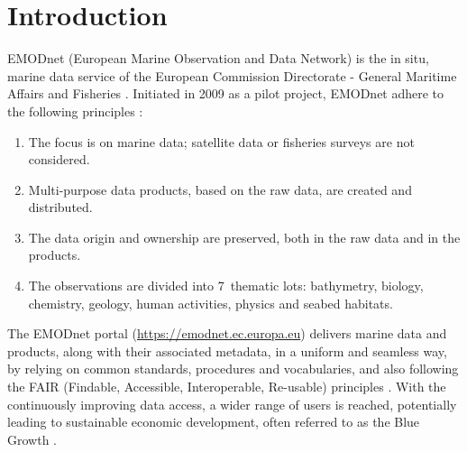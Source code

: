 \documentclass[essd,manuscript]{copernicus}
\begin{document}
\section{Introduction}

EMODnet (European Marine Observation and Data Network) is the in situ, marine data service of the European Commission Directorate - General Maritime Affairs and Fisheries \citep{MartinMiguez2019}. Initiated in 2009 as a pilot project, EMODnet adhere to the following principles \citep{Shepherd2018}: 
\begin{enumerate}
\item The focus is on marine data; satellite data or fisheries surveys are not considered. 
\item Multi-purpose data products, based on the raw data, are created and distributed. 
\item The data origin and ownership are preserved, both in the raw data and in the products. 
\item The observations are divided into 7~thematic lots: bathymetry, biology, chemistry, geology, human activities, physics and seabed habitats. 
\end{enumerate} 

The EMODnet portal (\url{https://emodnet.ec.europa.eu}) delivers marine data and products, along with their associated metadata, in a uniform and seamless way, by relying on common standards, procedures and vocabularies, and also following the FAIR (Findable, Accessible, Interoperable, Re-usable) principles \citep {Wilkinson2016,Wilkinson2019}. With the continuously improving data access, a wider range of users is reached, potentially leading to sustainable economic development, often referred to as the Blue Growth \citep{Commission2012}. 
\end{document}
